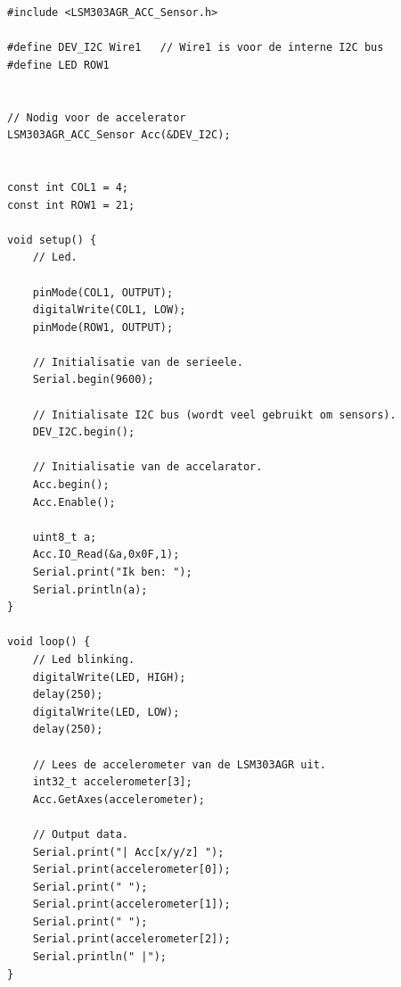 \begin{lstlisting}[caption={Looplicht van de bovenste rij.},label={lst:acc}]
#include <LSM303AGR_ACC_Sensor.h>

#define DEV_I2C Wire1   // Wire1 is voor de interne I2C bus 
#define LED ROW1 


// Nodig voor de accelerator 
LSM303AGR_ACC_Sensor Acc(&DEV_I2C);


const int COL1 = 4;   
const int ROW1 = 21;   

void setup() {
	// Led.
	
	pinMode(COL1, OUTPUT);
	digitalWrite(COL1, LOW);
	pinMode(ROW1, OUTPUT);
	
	// Initialisatie van de serieele.
	Serial.begin(9600);
	
	// Initialisate I2C bus (wordt veel gebruikt om sensors).
	DEV_I2C.begin();
	
	// Initialisatie van de accelarator.
	Acc.begin();
	Acc.Enable();
	
	uint8_t a;
	Acc.IO_Read(&a,0x0F,1);
	Serial.print("Ik ben: ");
	Serial.println(a);
}

void loop() {
	// Led blinking.
	digitalWrite(LED, HIGH);
	delay(250);
	digitalWrite(LED, LOW);
	delay(250);
	
	// Lees de accelerometer van de LSM303AGR uit.
	int32_t accelerometer[3];
	Acc.GetAxes(accelerometer);
	
	// Output data.
	Serial.print("| Acc[x/y/z] ");
	Serial.print(accelerometer[0]);
	Serial.print(" ");
	Serial.print(accelerometer[1]);
	Serial.print(" ");
	Serial.print(accelerometer[2]);
	Serial.println(" |");
}
\end{lstlisting}

